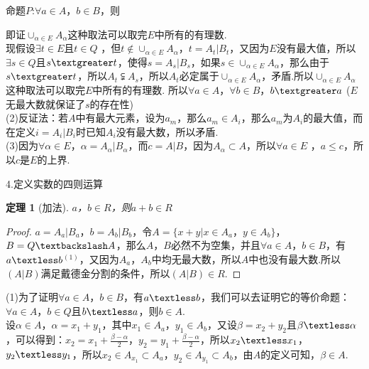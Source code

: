 \documentclass[12pt, a4paper, oneside]{ctexart}
\newtheorem{theorem}{定理}[section]
\begin{document}
\begin{note}
命题$P$:$\forall a\in A$，$b\in B$，则



即证$\cup_{\alpha \in E}A_{\alpha }$这种取法可以取完$E$中所有的有理数.\\
现假设$\exists t \in E$且$t\in Q$ ，但$t\not\in \cup_{\alpha \in E}A_{\alpha }$，$t=A_t|B_t$，又因为$E$没有最大值，所以$\exists s\in Q$且$s\textgreater t$，使得$s=A_s|B_s$，如果$s\in \cup_{\alpha \in E}A_{\alpha }$，那么由于$s \textgreater t$，所以$A_t \subsetneqq A_s$，所以$A_t$必定属于$\cup_{\alpha \in E}A_{\alpha }$，矛盾.所以$\cup_{\alpha \in E}A_{\alpha }$这种取法可以取完$E$中所有的有理数.
所以$\forall a \in A$，$\forall b\in B$，$b \textgreater a$ 
($E$无最大数就保证了$s$的存在性)\\
(2)反证法：若$A$中有最大元素，设为$a_m$，那么$a_m\in A_i$，那么$a_m$为$A_i$的最大值，而在定义$i=A_i|B_i$时已知$A_i$没有最大数，所以矛盾.\\
(3)因为$\forall \alpha \in E$，$\alpha=A_{\alpha}|B_{\alpha}$，而$c=A|B$，因为$A_{\alpha}\subset A$，所以$\forall a \in E$ ，$a\leq c$，所以$c$是$E$的上界.
\end{note}

4.定义实数的四则运算
\begin{theorem}[加法]
$a$，$b\in R$，则$a+b\in R$
\end{theorem}
\begin{proof}
$a=A_a|B_a$，$b=A_b|B_b$，令$A=\{x+y|x\in A_a \mbox{，} y\in A_b\}$，$B=Q \textbackslash A$，那么$A$，$B$必然不为空集，并且$\forall a\in A$，$b\in B$，有$a\textless b$$^{(1)}$，又因为$A_a$，$A_b$中均无最大数，所以$A$中也没有最大数.所以$(A|B)$满足戴德金分割的条件，所以$(A|B)\in R$.
\end{proof}

(1)为了证明$\forall a\in A$，$b\in B$，有$a\textless b$，我们可以去证明它的等价命题：$\forall a\in A $，$b\in Q$且$b\textless a$，则$b\in A$.\\
设$\alpha\in A$，$\alpha=x_1+y_1$，其中$x_1\in A_a$，$y_1\in A_b$，又设$\beta=x_2+y_2$且$\beta \textless \alpha$，可以得到：$x_2=x_1+\frac{\beta-\alpha}{2}$，$y_2=y_1+\frac{\beta-\alpha}{2}$，所以$x_2\textless x_1$，$y_2\textless y_1$，所以$x_2\in A_{x_1}\subset A_a$，$y_2\in A_{y_1}\subset A_b$，由$A$的定义可知，$\beta \in A$.
\end{document}
